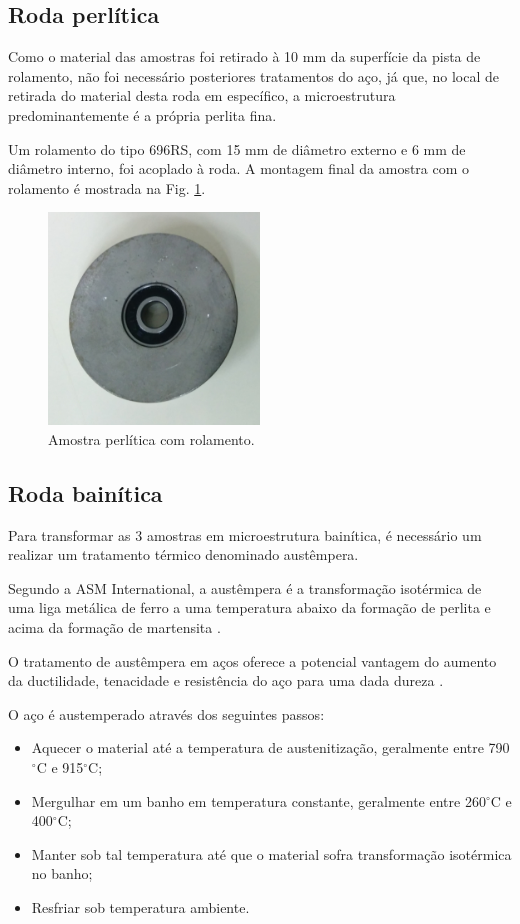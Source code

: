 \documentclass[
12pt,
openany, %
oneside, %
a4paper,			
english,			
brazil			        %
]{abntbibufjf}
\begin{document}
\subsection{Roda perlítica}
	Como o material das amostras foi retirado à 10 mm da superfície da pista de rolamento, não foi necessário posteriores tratamentos do aço, já que, no local de retirada do material desta roda em específico, a microestrutura predominantemente é a própria perlita fina.
	
	Um rolamento do tipo 696RS, com 15 mm de diâmetro externo e 6 mm de diâmetro interno, foi acoplado à roda. A montagem final da amostra com o rolamento é mostrada na Fig. \ref{fig:amostra_perlita}.
	
	\begin{figure}[H]
		\centering
		\includegraphics[width=0.5\textwidth]{amostra_perlita}
		\caption{Amostra perlítica com rolamento.}
		\label{fig:amostra_perlita}
	\end{figure}
	

\subsection{Roda bainítica}

	Para transformar as 3 amostras em microestrutura bainítica, é necessário um realizar um tratamento térmico denominado austêmpera.
	
	Segundo a ASM International, a austêmpera é a transformação isotérmica de uma liga metálica de ferro a uma temperatura abaixo da formação de perlita e acima da formação de martensita \cite{asm1991heat}.
	
	O tratamento de austêmpera em aços oferece a potencial vantagem do aumento da ductilidade, tenacidade e resistência do aço para uma dada dureza \cite{asm1991heat}.
	
	O aço é austemperado através dos seguintes passos:
	\begin{itemize}
		\item Aquecer o material até a temperatura de austenitização, geralmente entre 790$^{\circ}$C e 915$^{\circ}$C;
		\item Mergulhar em um banho em temperatura constante, geralmente entre 260$^{\circ}$C e 400$^{\circ}$C;
		\item Manter sob tal temperatura até que o material sofra transformação isotérmica no banho;
		\item Resfriar sob temperatura ambiente.
	\end{itemize}
\end{document}
